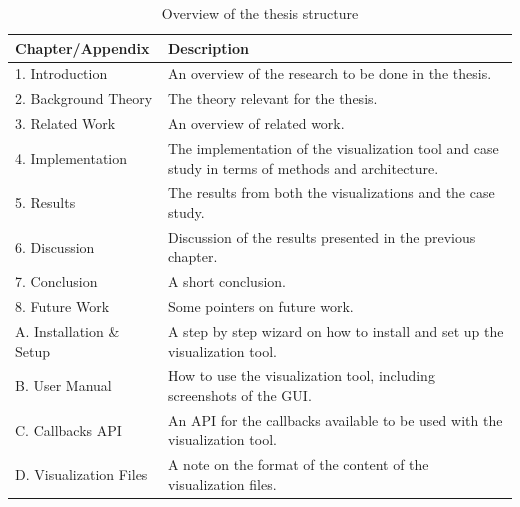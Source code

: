 \begin{table}[!h]
\begin{center}
\begin{tabular}{ | l | p{8cm} |}
\hline
\textbf{Chapter/Appendix} & \textbf{Description} \\ \hline
1. Introduction & An overview of the research to be done in the thesis. \\ \hline
2. Background Theory & The theory relevant for the thesis. \\ \hline
3. Related Work & An overview of related work. \\ \hline
4. Implementation & The implementation of the visualization tool and case study in terms of methods and architecture. \\ \hline
5. Results & The results from both the visualizations and the case study. \\ \hline
6. Discussion & Discussion of the results presented in the previous chapter. \\ \hline
7. Conclusion & A short conclusion. \\ \hline
8. Future Work & Some pointers on future work. \\ \hline
A. Installation \& Setup & A step by step wizard on how to install and set up the visualization tool. \\ \hline
B. User Manual & How to use the visualization tool, including screenshots of the GUI. \\ \hline
C. Callbacks API & An API for the callbacks available to be used with the visualization tool. \\ \hline
D. Visualization Files & A note on the format of the content of the visualization files. \\ \hline
\end{tabular}
\end{center}
\caption{Overview of the thesis structure}
\label{tab:1}
\end{table}

\cleardoublepage
